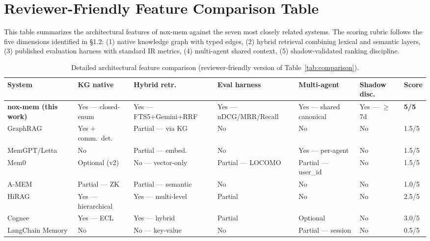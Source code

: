 \documentclass{article}
\begin{document}
\section{Reviewer-Friendly Feature Comparison Table}

This table summarizes the architectural features of nox-mem against the seven most closely
related systems. The scoring rubric follows the five dimensions identified in \S1.2: (1)
native knowledge graph with typed edges, (2) hybrid retrieval combining lexical and
semantic layers, (3) published evaluation harness with standard IR metrics, (4) multi-agent
shared context, (5) shadow-validated ranking discipline.

\begin{table}[h]
  \caption{Detailed architectural feature comparison (reviewer-friendly version of
    Table~\ref{tab:comparison}).}
  \centering
  \small
  \begin{tabular}{lllllll}
    \toprule
    System & KG native & Hybrid retr. & Eval harness & Multi-agent & Shadow disc. & Score \\
    \midrule
    \textbf{nox-mem (this work)} & Yes --- closed-enum & Yes --- FTS5+Gemini+RRF & Yes --- nDCG/MRR/Recall & Yes --- shared canonical & Yes --- $\geq$7d & \textbf{5/5} \\
    GraphRAG \cite{edge2024graphrag} & Yes + comm.\ det. & Partial --- via KG & No & No & No & 1.5/5 \\
    MemGPT/Letta \cite{packer2023memgpt} & No & Partial --- embed. & No & Yes --- per-agent & No & 1.5/5 \\
    Mem0 \cite{chhikara2025mem0} & Optional (v2) & No --- vector-only & Partial --- LOCOMO & Partial --- user\_id & No & 1.5/5 \\
    A-MEM \cite{xu2025amem} & Partial --- ZK & Partial --- semantic & No & No & No & 1.0/5 \\
    HiRAG \cite{huang2025hirag} & Yes --- hierarchical & Yes --- multi-level & Partial & No & No & 2.5/5 \\
    Cognee \cite{topoteretes2024cognee} & Yes --- ECL & Yes --- hybrid & Partial & Optional & No & 3.0/5 \\
    LangChain Memory & No & No --- key-value & No & Partial --- session & No & 0.5/5 \\
    \bottomrule
  \end{tabular}
\end{table}

\end{document}

